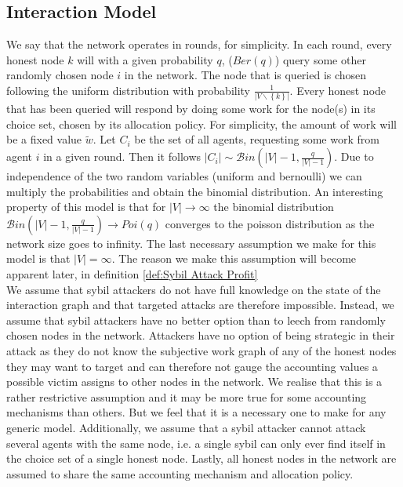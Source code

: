 \subsection{Interaction Model}
\label{subsec:Interaction Model}
\noindent{}We say that the network operates in rounds, for simplicity. In each round, every honest node $k$ will with a given probability $q$, ($Ber(q)$) query some other randomly chosen node $i$ in the network. The node that is queried is chosen following the uniform distribution with probability $\frac{1}{|V\backslash\left\lbrace{}k\right\rbrace{}|}$. Every honest node that has been queried will respond by doing some work for the node(s) in its choice set, chosen by its allocation policy. For simplicity, the amount of work will be a fixed value $\tilde{w}$. Let $C_i$ be the set of all agents, requesting some work from agent $i$ in a given round. Then it follows $|C_i|\sim\mathcal{B}in(|V|-1,\frac{q}{|V|-1})$. Due to independence of the two random variables (uniform and bernoulli) we can multiply the probabilities and obtain the binomial distribution. An interesting property of this model is that for $|V|\rightarrow\infty$ the binomial distribution $\mathcal{B}in(|V|-1,\frac{q}{|V|-1})\rightarrow{}Poi(q)$ converges to the poisson distribution as the network size goes to infinity. The last necessary assumption we make for this model is that $|V|=\infty$. The reason we make this assumption will become apparent later, in definition \ref{def:Sybil Attack Profit}\vspace{1em}\\

\noindent{}We assume that sybil attackers do not have full knowledge on the state of the interaction graph and that targeted attacks are therefore impossible. Instead, we assume that sybil attackers have no better option than to leech from randomly chosen nodes in the network. Attackers have no option of being strategic in their attack as they do not know the subjective work graph of any of the honest nodes they may want to target and can therefore not gauge the accounting values a possible victim assigns to other nodes in the network. We realise that this is a rather restrictive assumption and it may be more true for some accounting mechanisms than others. But we feel that it is a necessary one to make for any generic model. Additionally, we assume that a sybil attacker cannot attack several agents with the same node, i.e. a single sybil can only ever find itself in the choice set of a single honest node. Lastly, all honest nodes in the network are assumed to share the same accounting mechanism and allocation policy.\vspace{1em}\\


